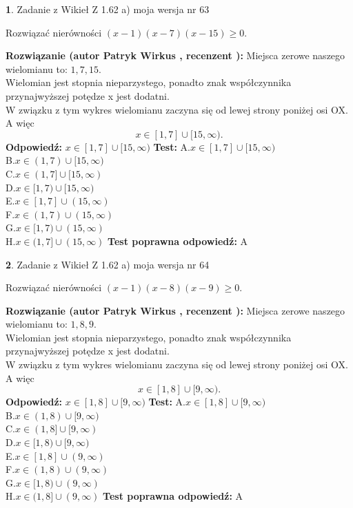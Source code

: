 \documentclass[12pt, a4paper]{article}
\theoremstyle{definition} %
\newtheorem{zad}{}
\newcommand{\zadStart}[1]{\begin{zad}#1\newline}
\newcommand{\zadStop}{\end{zad}}
\newcommand{\rozwStart}[2]{\noindent \textbf{Rozwiązanie (autor #1 , recenzent #2): }\newline}
\newcommand{\rozwStop}{\newline}
\newcommand{\odpStart}{\noindent \textbf{Odpowiedź:}\newline}
\newcommand{\odpStop}{\newline}
\newcommand{\testStart}{\noindent \textbf{Test:}\newline}
\newcommand{\testStop}{\newline}
\newcommand{\kluczStart}{\noindent \textbf{Test poprawna odpowiedź:}\newline}
\newcommand{\kluczStop}{\newline}
\begin{document}
\zadStart{Zadanie z Wikieł Z 1.62 a) moja wersja nr 63}

Rozwiązać nierówności $(x-1)(x-7)(x-15)\ge0$.
\zadStop
\rozwStart{Patryk Wirkus}{}
Miejsca zerowe naszego wielomianu to: $1, 7, 15$.\\
Wielomian jest stopnia nieparzystego, ponadto znak współczynnika przy\linebreak najwyższej potędze x jest dodatni.\\ W związku z tym wykres wielomianu zaczyna się od lewej strony poniżej osi OX. A więc $$x \in [1,7] \cup [15,\infty).$$
\rozwStop
\odpStart
$x \in [1,7] \cup [15,\infty)$
\odpStop
\testStart
A.$x \in [1,7] \cup [15,\infty)$\\
B.$x \in (1,7) \cup [15,\infty)$\\
C.$x \in (1,7] \cup [15,\infty)$\\
D.$x \in [1,7) \cup [15,\infty)$\\
E.$x \in [1,7] \cup (15,\infty)$\\
F.$x \in (1,7) \cup (15,\infty)$\\
G.$x \in [1,7) \cup (15,\infty)$\\
H.$x \in (1,7] \cup (15,\infty)$
\testStop
\kluczStart
A
\kluczStop



\zadStart{Zadanie z Wikieł Z 1.62 a) moja wersja nr 64}

Rozwiązać nierówności $(x-1)(x-8)(x-9)\ge0$.
\zadStop
\rozwStart{Patryk Wirkus}{}
Miejsca zerowe naszego wielomianu to: $1, 8, 9$.\\
Wielomian jest stopnia nieparzystego, ponadto znak współczynnika przy\linebreak najwyższej potędze x jest dodatni.\\ W związku z tym wykres wielomianu zaczyna się od lewej strony poniżej osi OX. A więc $$x \in [1,8] \cup [9,\infty).$$
\rozwStop
\odpStart
$x \in [1,8] \cup [9,\infty)$
\odpStop
\testStart
A.$x \in [1,8] \cup [9,\infty)$\\
B.$x \in (1,8) \cup [9,\infty)$\\
C.$x \in (1,8] \cup [9,\infty)$\\
D.$x \in [1,8) \cup [9,\infty)$\\
E.$x \in [1,8] \cup (9,\infty)$\\
F.$x \in (1,8) \cup (9,\infty)$\\
G.$x \in [1,8) \cup (9,\infty)$\\
H.$x \in (1,8] \cup (9,\infty)$
\testStop
\kluczStart
A
\kluczStop
\end{document}
